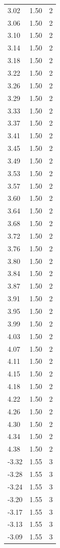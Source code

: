 \begin{longtable}{lrr}
  3.02 & 1.50 & 2 \\
  3.06 & 1.50 & 2 \\
  3.10 & 1.50 & 2 \\
  3.14 & 1.50 & 2 \\
  3.18 & 1.50 & 2 \\
  3.22 & 1.50 & 2 \\
  3.26 & 1.50 & 2 \\
  3.29 & 1.50 & 2 \\
  3.33 & 1.50 & 2 \\
  3.37 & 1.50 & 2 \\
  3.41 & 1.50 & 2 \\
  3.45 & 1.50 & 2 \\
  3.49 & 1.50 & 2 \\
  3.53 & 1.50 & 2 \\
  3.57 & 1.50 & 2 \\
  3.60 & 1.50 & 2 \\
  3.64 & 1.50 & 2 \\
  3.68 & 1.50 & 2 \\
  3.72 & 1.50 & 2 \\
  3.76 & 1.50 & 2 \\
  3.80 & 1.50 & 2 \\
  3.84 & 1.50 & 2 \\
  3.87 & 1.50 & 2 \\
  3.91 & 1.50 & 2 \\
  3.95 & 1.50 & 2 \\
  3.99 & 1.50 & 2 \\
  4.03 & 1.50 & 2 \\
  4.07 & 1.50 & 2 \\
  4.11 & 1.50 & 2 \\
  4.15 & 1.50 & 2 \\
  4.18 & 1.50 & 2 \\
  4.22 & 1.50 & 2 \\
  4.26 & 1.50 & 2 \\
  4.30 & 1.50 & 2 \\
  4.34 & 1.50 & 2 \\
  4.38 & 1.50 & 2 \\
  -3.32 & 1.55 & 3 \\
  -3.28 & 1.55 & 3 \\
  -3.24 & 1.55 & 3 \\
  -3.20 & 1.55 & 3 \\
  -3.17 & 1.55 & 3 \\
  -3.13 & 1.55 & 3 \\
  -3.09 & 1.55 & 3 \\

\end{longtable}
